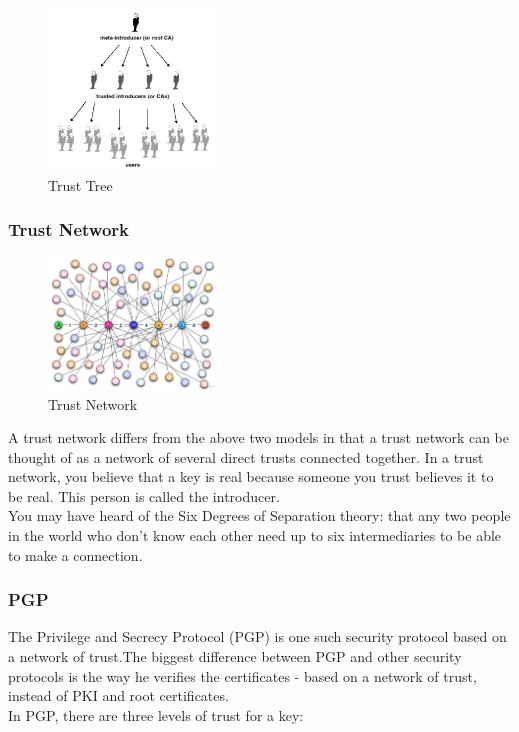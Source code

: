 \begin{figure}[H] %
    \centering %
    \includegraphics[width=0.4\textwidth]{figures/trustTree.png} %
    \caption{Trust Tree} %
    \label{Fig.4: Trust Tree} %
    \end{figure}


\subsubsection{Trust Network}
\begin{figure}[H] %
    \centering %
    \includegraphics[width=0.4\textwidth]{figures/trustNet.png} %
    \caption{Trust Network} %
    \label{Fig.5: Trust Network} %
    \end{figure}
A trust network differs from the above two models in that a trust network can be 
thought of as a network of several direct trusts connected together. In a trust 
network\cite{b27}, you believe that a key is real because someone you trust believes it to 
be real. This person is called the introducer\cite{b28}.
\\
You may have heard of the Six Degrees of Separation theory\cite{b37}: that any two people 
in the world who don't know each other need up to six intermediaries to be able 
to make a connection\cite{b29}.


\subsubsection{PGP}
The Privilege and Secrecy Protocol (PGP) is one such security protocol based on 
a network of trust\cite{b11}.The biggest difference between PGP and other security protocols 
is the way he verifies the certificates - based on a network of trust, instead of PKI 
and root certificates\cite{b12}.
\\
In PGP, there are three levels of trust for a key:

